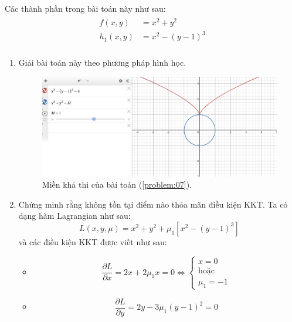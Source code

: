\begin{solution}

    Các thành phần trong bài toán này như sau:
    \begin{align}
        \begin{aligned}
            f(x,y) &= x^2 + y^2\\
            h_1(x,y) &= x^2 - (y - 1)^3\\
        \end{aligned}
    \end{align}
    \begin{enumerate}[label=(\alph*)]
    \item Giải bài toán này theo phương pháp hình học.
    \begin{figure}[h!]
        \includegraphics[width=0.85\linewidth]{figures/BT07.png}
        \caption{Miền khả thi của bài toán (\ref{problem:07}).}
        \label{fig:feasible_region_problem_03}
    \end{figure}
    \item Chứng minh rằng không tồn tại điểm nào thỏa mãn điều kiện KKT. Ta có dạng hàm Lagrangian như sau:
    \begin{equation}
        L(x, y, \mu) = x^2 + y^2 + \mu_1\left[x^2 - (y - 1)^3\right]
    \end{equation}
    và các điều kiện KKT được viết như sau:
    \begin{itemize}
        \item \begin{equation}
            \dfrac{\partial L}{\partial x} = 2x + 2\mu_1x = 0 \Leftrightarrow \begin{cases}
                x = 0\\ 
                \text{hoặc} \\
                \mu_1 = -1
            \end{cases}
        \end{equation}
        \item \begin{equation}
            \dfrac{\partial L}{\partial y} = 2y - 3\mu_1(y-1)^2 = 0

\end{equation}
\end{itemize}
\end{enumerate}
\end{solution}
